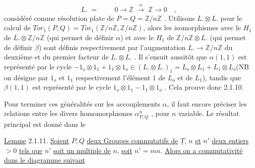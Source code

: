 \begin{equation*}
L. \;=\; \qquad 0 \longrightarrow \mathbb{Z} \;\xrightarrow{\;n\;}\; \mathbb{Z} \longrightarrow 0 \quad ,
\end{equation*}
considéré comme résolution plate de $P = Q = \mathbb{Z}/n\mathbb{Z}$ . Utilisons $L.\otimes L.$ pour le calcul de $Tor_1(P,Q) = Tor_1(\mathbb{Z}/n\mathbb{Z} , \mathbb{Z}/n\mathbb{Z})$, alors les isomorphismes avec le $H_1$ de $L.\otimes\mathbb{Z}/n\mathbb{Z}$ (qui permet de définir $\alpha$) et avec le $H_1$ de $\mathbb{Z}/n\mathbb{Z}\otimes L.$ (qui permet de définir $\beta$) sont définis respectivement par l'augmentation $L. \longrightarrow \mathbb{Z}/n\mathbb{Z}$ du deuxième et du premier facteur de $L.\otimes L.$ . Il s'ensuit aussitôt que $\alpha(1,1)$ est représenté par le cycle $- 1_o\otimes 1_1 + 1_1\otimes 1_o \in (L.\otimes L.)_1 = L_o\otimes L_1 + L_1\otimes L_o$(NB on désigne par $1_o$ et $1_1$ respectivement l'élément $1$ de $L_o$ et de $L_1$), tandis que $\beta(1,1)$ est représenté par le cycle $1_o\otimes 1_1 - 1_1\otimes 1_o$ . Cela prouve donc 2.1.10.

Pour terminer ces généralités sur les accouplements $\alpha$, il faut encore préciser les relations entre les divers homomorphismes $\alpha^n_{P,Q}$ , pour $n$ variable. Le résultat principal est donné dans le

\underline{Lemme} 2.1.11. \underline{Soient} $P,Q$ \underline{deux Groupes commutatifs de} $\underline{T}$, $n$ \underline{et} $n'$ \underline{deux entiers} $> 0$ \underline{tels que} $n'$ \underline{soit un multiple de} $n$, \underline{soit} $n' = mn$. \underline{Alors on a commutativité dans le diagramme suivant}


